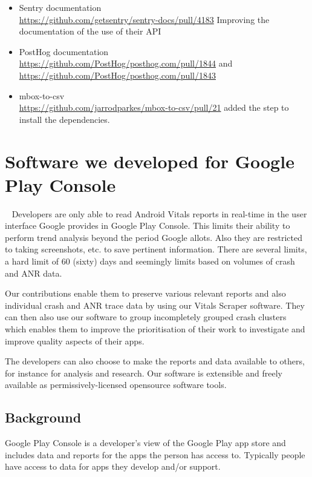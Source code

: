 \begin{itemize}
    \item Sentry documentation\\
    \url{https://github.com/getsentry/sentry-docs/pull/4183} Improving the documentation of the use of their API
    
    \item PostHog documentation\\
    \url{https://github.com/PostHog/posthog.com/pull/1844} and \url{https://github.com/PostHog/posthog.com/pull/1843}
    
    \item mbox-to-csv\\
    \url{https://github.com/jarrodparkes/mbox-to-csv/pull/21} added the step to install the dependencies.
\end{itemize}

\section{Software we developed for Google Play Console}~\label{sec:software-we-developed-for-google-play-console}
Developers are only able to read Android Vitals reports in real-time in the user interface Google provides in Google Play Console. This limits their ability to perform trend analysis beyond the period Google allots. Also they are restricted to taking screenshots, etc. to save pertinent information. There are several limits, a hard limit of 60 (sixty) days and seemingly limits based on volumes of crash and ANR data. 

Our contributions enable them to preserve various relevant reports and also individual crash and ANR trace data by using our Vitals Scraper software. They can then also use our software to group incompletely grouped crash clusters which enables them to improve the prioritisation of their work to investigate and improve quality aspects of their apps.

The developers can also choose to make the reports and data available to others, for instance for analysis and research. Our software is extensible and freely available as permissively-licensed opensource software tools. 

\subsection{Background}
Google Play Console is a developer's view of the Google Play app store and includes data and reports for the apps the person has access to. Typically people have access to data for apps they develop and/or support.

